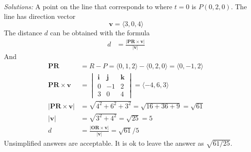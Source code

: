 \begin{parts}
    \ifnum {} {\color{DarkBlue} \textit{Solutions:} 
    A point on the line that corresponds to where $t=0$ is $P(0,2,0)$. The line has direction vector 
    $$\mathbf v = \langle 3,0,4\rangle$$
    The distance $d$ can be obtained with the formula 
    \begin{align}
        d &= \frac{|\mathbf{PR}\times \mathbf v|}{|\mathbf v|}
    \end{align}
    And 
    \begin{align}
        \mathbf{PR} &= R - P = \langle 0,1,2 \rangle  - \langle 0,2,0\rangle= \langle 0,-1,2 \rangle \\
        \mathbf{PR} \times \mathbf v 
        &= \begin{vmatrix} \mathbf i&\mathbf j&\mathbf k \\ 0&-1&2 \\ 3&0&4\end{vmatrix} 
        = \langle -4,6,3\rangle\\
        |\mathbf{PR}\times \mathbf v| &= \sqrt{4^2+6^2+3^2} = \sqrt{16+36+9} = \sqrt{61}\\
        |\mathbf v| &= \sqrt{3^2+4^2} = \sqrt{25} = 5\\
        d &= \frac{|\mathbf{OR}\times \mathbf v|}{|\mathbf v|} = \sqrt{ 61 }/5
    \end{align}
    Unsimplified answers are acceptable. It is ok to leave the answer as $\sqrt{61/25}$.
    } 
    \else
    \vspace{4cm}
    \fi       
\end{parts}

\fi    




\ifnum {}

